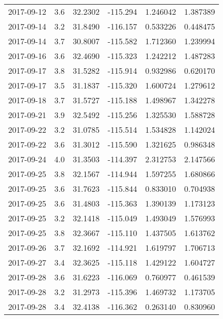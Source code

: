 \begin{tabular}{lrrrrr}
2017-09-12 &       3.6 &  32.2302 &  -115.294 &         1.246042 &         1.387389 \\
2017-09-14 &       3.2 &  31.8490 &  -116.157 &         0.533226 &         0.448475 \\
2017-09-14 &       3.7 &  30.8007 &  -115.582 &         1.712360 &         1.239994 \\
2017-09-16 &       3.6 &  32.4690 &  -115.323 &         1.242212 &         1.487283 \\
2017-09-17 &       3.8 &  31.5282 &  -115.914 &         0.932986 &         0.620170 \\
2017-09-17 &       3.5 &  31.1837 &  -115.320 &         1.600724 &         1.279612 \\
2017-09-18 &       3.7 &  31.5727 &  -115.188 &         1.498967 &         1.342278 \\
2017-09-21 &       3.9 &  32.5492 &  -115.256 &         1.325530 &         1.588728 \\
2017-09-22 &       3.2 &  31.0785 &  -115.514 &         1.534828 &         1.142024 \\
2017-09-22 &       3.6 &  31.3012 &  -115.590 &         1.321625 &         0.986348 \\
2017-09-24 &       4.0 &  31.3503 &  -114.397 &         2.312753 &         2.147566 \\
2017-09-25 &       3.8 &  32.1567 &  -114.944 &         1.597255 &         1.680866 \\
2017-09-25 &       3.6 &  31.7623 &  -115.844 &         0.833010 &         0.704938 \\
2017-09-25 &       3.6 &  31.4803 &  -115.363 &         1.390139 &         1.173123 \\
2017-09-25 &       3.2 &  32.1418 &  -115.049 &         1.493049 &         1.576993 \\
2017-09-25 &       3.8 &  32.3667 &  -115.110 &         1.437505 &         1.613762 \\
2017-09-26 &       3.7 &  32.1692 &  -114.921 &         1.619797 &         1.706713 \\
2017-09-27 &       3.4 &  32.3625 &  -115.118 &         1.429122 &         1.604727 \\
2017-09-28 &       3.6 &  31.6223 &  -116.069 &         0.760977 &         0.461539 \\
2017-09-28 &       3.2 &  31.2973 &  -115.396 &         1.469732 &         1.173705 \\
2017-09-28 &       3.4 &  32.4138 &  -116.362 &         0.263140 &         0.830960 \\

\end{tabular}
